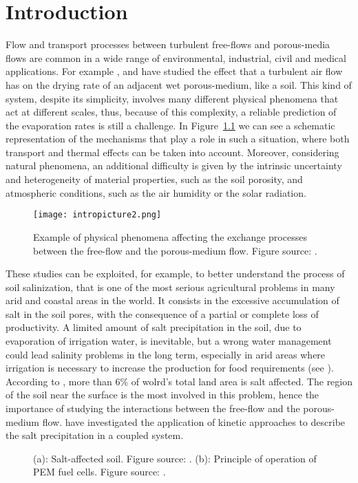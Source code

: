 \chapter{Introduction}
Flow and transport processes between turbulent free-flows and porous-media 
flows are common in a wide range of environmental, industrial, civil and medical 
applications.
For example \textcite{tesi:mosthaf}, \textcite{intro:davarzani} and \textcite  {tesi:fetzer} have studied the effect that a turbulent air flow has on the 
drying rate of an adjacent wet porous-medium, like a soil. This kind of system, despite its simplicity, involves many different physical phenomena that act at different scales, thus, because of this complexity, a reliable prediction of the evaporation rates is still a challenge. In Figure~\ref{fig:intro} we can see a schematic representation of the mechanisms that play a role in such a situation, where both transport and thermal effects can be taken into account. Moreover, considering natural phenomena, an additional difficulty is given by the intrinsic uncertainty and heterogeneity of material properties, such as the soil porosity, and atmospheric conditions, such as the air humidity or the solar radiation.
\begin{figure}[ht]
	\centering
	\texttt{[image: intropicture2.png]}
	\caption[Exchange processes between free and porous-medium 
	flows]{Example of physical phenomena affecting the exchange processes 
		between the free-flow and the porous-medium flow. Figure source: 
		\cite{tesi:fetzer}.}
	\label{fig:intro}
\end{figure}

These studies can be exploited, for example, to better understand the process of soil salinization, that is one of the most serious agricultural problems in many arid and coastal areas in the world. It consists in the excessive accumulation of salt in the soil pores, with the consequence of a partial or complete loss of productivity. A limited amount of salt precipitation in the soil, due to evaporation of irrigation water, is inevitable, but a wrong water management could lead salinity problems in the long term, especially in arid areas where irrigation is necessary to increase the production for food requirements (see \cite{web:fao}). According to \cite{soil:munns}, more than 6\% of wolrd's total land area is salt affected.
The region of the soil near the surface is the most involved in this problem, hence the importance of studying the interactions between the free-flow and the porous-medium flow. \textcite{intro:salinization} have investigated the application of kinetic approaches to describe the salt precipitation in a coupled system.
\begin{figure}
	\centering
	\caption{(a): Salt-affected soil. Figure source: \cite{web:fao}. (b): Principle of operation of PEM fuel cells. Figure source: \cite{intro:pemfig}.}
	\label{fig:intro2}
\end{figure}

